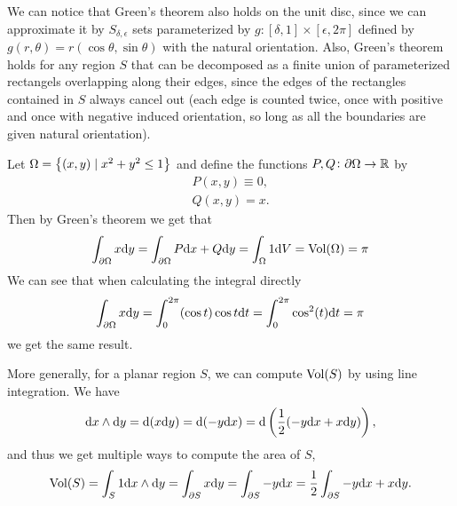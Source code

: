 \documentclass[11pt,a4paper]{article}
\begin{document}
\begin{remark}
  We can notice that Green's theorem also holds on the unit disc,
  since we can approximate it by $S_{\delta,\epsilon}$
  sets parameterized by $g \colon [\delta,1] \times [\epsilon,2\pi]$
  defined by $g(r,\theta) = r (\cos \theta, \sin \theta)$
  with the natural orientation.
  Also, Green's theorem holds for any region $S$
  that can be decomposed as a finite union of parameterized rectangels
  overlapping along their edges, since the edges of the rectangles
  contained in $S$ always cancel out (each edge is counted twice,
  once with positive and once with negative induced orientation,
  so long as all the boundaries are given natural orientation).
\end{remark}

\begin{example}
  Let $\Omega = \left\{(x,y) \mid x^2 + y^2 \le 1\right\}$ and define
  the functions $P,Q \colon \partial \Omega \to \mathbb{R}$ by
  \begin{gather*}
    P(x,y) \equiv 0, \\
    Q(x,y) = x.
  \end{gather*}
  Then by Green's theorem we get that
  \[
    \int_{\partial \Omega} x \dy =
    \int_{\partial \Omega} P\dx + Q\dy =
    \int_{\Omega} 1 \dV = \Vol(\Omega) = \pi
  \]
  We can see that when calculating the integral directly
  \[
    \int_{\partial \Omega} x \dy =
    \int_{0}^{2\pi} (\cos t) \cos t \dt =
    \int_{0}^{2\pi} \cos^2 (t) \dt = \pi
  \]
  we get the same result.
\end{example}
\begin{remark}
  More generally, for a planar region $S$, we can compute $\operatorname{Vol}(S)$
  by using line integration.
  We have
  \[
    \dx \wedge \dy =
    \dif(x \dy) =
    \dif(-y \dx) =
    \dif\del{\half (-y \dx + x \dy)},
  \]
  and thus we get multiple ways to compute the area of $S$,
  \[
    \Vol(S) =
    \int_{S} 1 \dx \wedge \dy =
    \int_{\partial S} x \dy =
    \int_{\partial S} -y \dx =
    \half \int_{\partial S} -y \dx + x \dy.
  \]
\end{remark}
\end{document}
